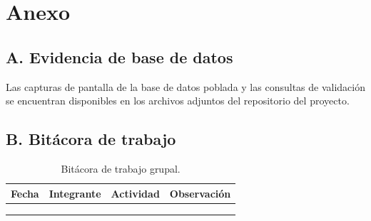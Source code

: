 \documentclass[10pt,a4paper]{article}
\begin{document}
\newpage
\appendix
\section*{Anexo}

\subsection*{A. Evidencia de base de datos}

Las capturas de pantalla de la base de datos poblada y las consultas de validaci\'on se encuentran disponibles en los archivos adjuntos del repositorio del proyecto.


\subsection*{B. Bit\'acora de trabajo}

\begin{table}[H]
\centering
\caption{Bit\'acora de trabajo grupal.}
\label{tab:bitacora}
\small
\begin{tabular}{p{2cm} p{3cm} p{4cm} p{4.5cm}}
\toprule
\textbf{Fecha} & \textbf{Integrante} & \textbf{Actividad} & \textbf{Observaci\'on} \\
\midrule
 &  &  &  \\
 &  &  &  \\
 &  &  &  \\
\bottomrule
\end{tabular}
\end{table}
\end{document}
